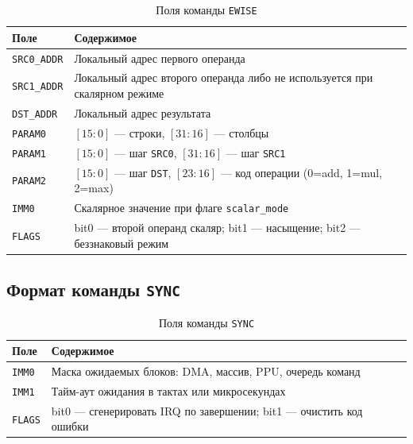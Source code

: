 \documentclass[12pt,a4paper]{article}
\begin{document}
\begin{table}[H]
    \centering
    \caption{Поля команды \texttt{EWISE}}
    \begin{tabular}{|L{2.6cm}|L{10.1cm}|}
        \hline
        \textbf{Поле} & \textbf{Содержимое} \\
        \hline
        \texttt{SRC0\_ADDR} & Локальный адрес первого операнда \\
        \hline
        \texttt{SRC1\_ADDR} & Локальный адрес второго операнда либо не используется при скалярном режиме \\
        \hline
        \texttt{DST\_ADDR} & Локальный адрес результата \\
        \hline
        \texttt{PARAM0} & \([15:0]\) --- строки, \([31:16]\) --- столбцы \\
        \hline
        \texttt{PARAM1} & \([15:0]\) --- шаг \texttt{SRC0}, \([31:16]\) --- шаг \texttt{SRC1} \\
        \hline
        \texttt{PARAM2} & \([15:0]\) --- шаг \texttt{DST}, \([23:16]\) --- код операции (0=add, 1=mul, 2=max) \\
        \hline
        \texttt{IMM0} & Скалярное значение при флаге \texttt{scalar\_mode} \\
        \hline
        \texttt{FLAGS} & bit0 --- второй операнд скаляр; bit1 --- насыщение; bit2 --- беззнаковый режим \\
        \hline
    \end{tabular}
\end{table}

\subsection{Формат команды \texttt{SYNC}}

\begin{table}[H]
    \centering
    \caption{Поля команды \texttt{SYNC}}
    \begin{tabular}{|L{2.6cm}|L{10.1cm}|}
        \hline
        \textbf{Поле} & \textbf{Содержимое} \\
        \hline
        \texttt{IMM0} & Маска ожидаемых блоков: DMA, массив, PPU, очередь команд \\
        \hline
        \texttt{IMM1} & Тайм-аут ожидания в тактах или микросекундах \\
        \hline
        \texttt{FLAGS} & bit0 --- сгенерировать IRQ по завершении; bit1 --- очистить код ошибки \\
        \hline
    \end{tabular}
\end{table}
\end{document}
